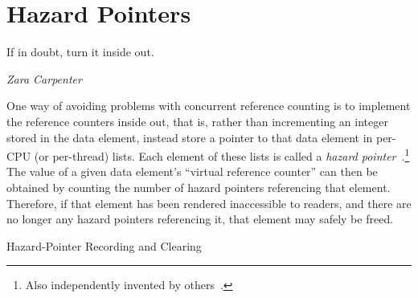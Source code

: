 
\section{Hazard Pointers}
\label{sec:defer:Hazard Pointers}
%
\epigraph{If in doubt, turn it inside out.}{\emph{Zara Carpenter}}

One way of avoiding problems with concurrent reference counting
is to implement the reference counters
inside out, that is, rather than incrementing an integer stored in the
data element, instead store a pointer to that data element in
per-CPU (or per-thread) lists.
Each element of these lists is called a
\emph{hazard pointer}~\cite{MagedMichael04a}.\footnote{
	Also independently invented by others~\cite{HerlihyLM02}.}
The value of a given data element's ``virtual reference counter'' can
then be obtained by counting the number of hazard pointers referencing
that element.
Therefore, if that element has been rendered inaccessible to readers,
and there are no longer any hazard pointers referencing it, that element
may safely be freed.

\begin{listing}

\caption{Hazard-Pointer Recording and Clearing}
\label{lst:defer:Hazard-Pointer Recording and Clearing}
\end{listing}

